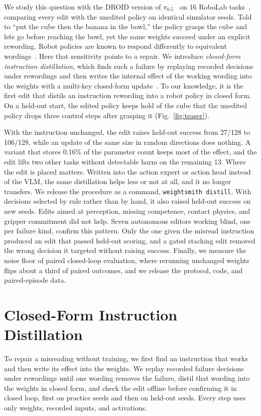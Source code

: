 \documentclass{article}
\newcommand{\pifive}{$\pi_{0.5}$}
\begin{document}
We study this question with the DROID version of \pifive{}~\citep{pi2025pi05,khazatsky2024droid} on 16 RoboLab tasks~\citep{yang2026robolab}, comparing every edit with the unedited policy on identical simulator seeds. Told to ``put the cube then the banana in the bowl,'' the policy grasps the cube and lets go before reaching the bowl, yet the same weights succeed under an explicit rewording. Robot policies are known to respond differently to equivalent wordings~\citep{fei2026liberoplus,kim2026liberopara,abbas2026samegoal}. Here that sensitivity points to a repair. We introduce \emph{closed-form instruction distillation}, which finds such a failure by replaying recorded decisions under rewordings and then writes the internal effect of the working wording into the weights with a multi-key closed-form update~\citep{meng2023memit}. To our knowledge, it is the first edit that distils an instruction rewording into a robot policy in closed form. On a held-out start, the edited policy keeps hold of the cube that the unedited policy drops three control steps after grasping it (Fig.~\ref{fig:teaser}).

With the instruction unchanged, the edit raises held-out success from 27/128 to 106/128, while an update of the same size in random directions does nothing. A variant that stores 0.16\% of the parameter count keeps most of the effect, and the edit lifts two other tasks without detectable harm on the remaining 13. Where the edit is placed matters. Written into the action expert or action head instead of the VLM, the same distillation helps less or not at all, and it no longer transfers. We release the procedure as a command, \texttt{weightsmith distill}. With decisions selected by rule rather than by hand, it also raised held-out success on new seeds. Edits aimed at perception, missing competence, contact physics, and gripper commitment did not help. Seven autonomous editors working blind, one per failure kind, confirm this pattern. Only the one given the misread instruction produced an edit that passed held-out scoring, and a gated stacking edit removed the wrong decision it targeted without raising success. Finally, we measure the noise floor of paired closed-loop evaluation, where rerunning unchanged weights flips about a third of paired outcomes, and we release the protocol, code, and paired-episode data.

\section{Closed-Form Instruction Distillation}
\label{sec:method}
To repair a misreading without training, we first find an instruction that works and then write its effect into the weights. We replay recorded failure decisions under rewordings until one wording removes the failure, distil that wording into the weights in closed form, and check the edit offline before confirming it in closed loop, first on practice seeds and then on held-out seeds. Every step uses only weights, recorded inputs, and activations.
\end{document}
